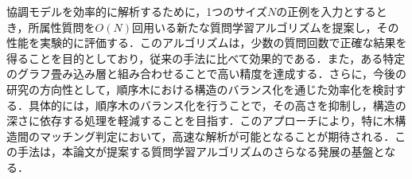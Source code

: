 協調モデルを効率的に解析するために，1つのサイズ$N$の正例を入力とするとき，所属性質問を$O(N)$回用いる新たな質問学習アルゴリズムを提案し，その性能を実験的に評価する．このアルゴリズムは，少数の質問回数で正確な結果を得ることを目的としており，従来の手法に比べて効果的である．また，ある特定のグラフ畳み込み層と組み合わせることで高い精度を達成する．さらに，今後の研究の方向性として，順序木における構造のバランス化を通じた効率化を検討する．具体的には，順序木のバランス化を行うことで，その高さを抑制し，構造の深さに依存する処理を軽減することを目指す．このアプローチにより，特に木構造間のマッチング判定において，高速な解析が可能となることが期待される．この手法は，本論文が提案する質問学習アルゴリズムのさらなる発展の基盤となる．

